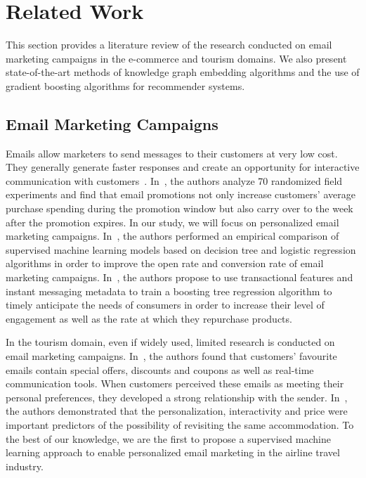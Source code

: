 \documentclass[11pt,dvipdfm]{article}
\begin{document}
\section{Related Work}
\label{sec:related-work}
This section provides a literature review of the research conducted on email marketing campaigns in the e-commerce and tourism domains. We also present state-of-the-art methods of knowledge graph embedding algorithms and the use of gradient boosting algorithms for recommender systems. 

\subsection{Email Marketing Campaigns}
\label{sec:sota-email-marketing}
Emails allow marketers to send messages to their customers at very low cost. They generally generate faster responses and create an opportunity for interactive communication with customers~\cite{Chittenden2003}. In~\cite{Sahni17}, the authors analyze 70 randomized field experiments and find that email promotions not only increase customers' average purchase spending during the promotion window but also carry over to the week after the promotion expires. In our study, we will focus on personalized email marketing campaigns. In~\cite{Abakouy17}, the authors performed an empirical comparison of supervised machine learning models based on decision tree and logistic regression algorithms in order to improve the open rate and conversion rate of email marketing campaigns. In~\cite{Deligiannis2020}, the authors propose to use transactional features and instant messaging metadata to train a boosting tree regression algorithm to timely anticipate the needs of consumers in order to increase their level of engagement as well as the rate at which they repurchase products.

In the tourism domain, even if widely used, limited research is conducted on email marketing campaigns. In~\cite{Tamho05}, the authors found that customers' favourite emails contain special offers, discounts and coupons as well as real-time communication tools. When customers perceived these emails as meeting their personal preferences, they developed a strong relationship with the sender. In~\cite{Yang19}, the authors demonstrated that the personalization, interactivity and price were important predictors of the possibility of revisiting the same accommodation. To the best of our knowledge, we are the first to propose a supervised machine learning approach to enable personalized email marketing in the airline travel industry.
\end{document}
